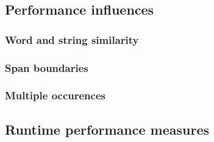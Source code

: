 \subsection{Performance influences}

\subsubsection{Word and string similarity}
\subsubsection{Span boundaries}
\subsubsection{Multiple occurences}

\subsection{Runtime performance measures}